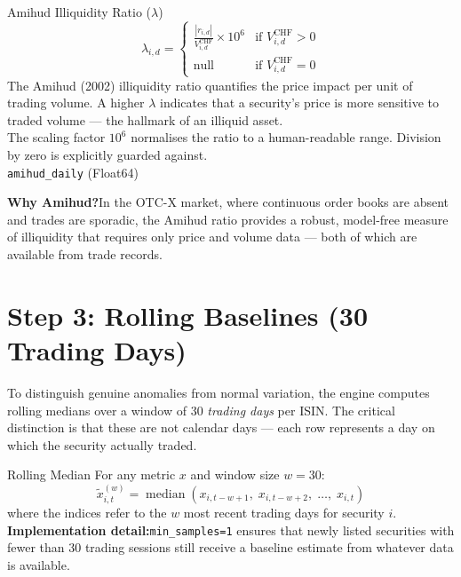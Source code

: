 \documentclass[
  11pt,
  a4paper,
  twoside,
  openany
]{report}
\begin{document}
\begin{formulabox}{Amihud Illiquidity Ratio ($\lambda$)}
\[
  \lambda_{i,d} =
  \begin{cases}
    \displaystyle\frac{|r_{i,d}|}{V_{i,d}^{\text{CHF}}} \times 10^{6} & \text{if } V_{i,d}^{\text{CHF}} > 0 \\[8pt]
    \text{null} & \text{if } V_{i,d}^{\text{CHF}} = 0
  \end{cases}
\]
The Amihud (2002) illiquidity ratio quantifies the price impact per unit of trading volume.  A higher $\lambda$ indicates that a security's price is more sensitive to traded volume — the hallmark of an illiquid asset.\\[4pt]
The scaling factor $10^6$ normalises the ratio to a human-readable range.  Division by zero is explicitly guarded against.\\[4pt]
\texttt{amihud\_daily} (Float64)
\end{formulabox}

\begin{insightbox}
\textbf{Why Amihud?}\;In the OTC-X market, where continuous order books are absent and trades are sporadic, the Amihud ratio provides a robust, model-free measure of illiquidity that requires only price and volume data — both of which are available from trade records.
\end{insightbox}

\section{Step 3: Rolling Baselines (30 Trading Days)}

To distinguish genuine anomalies from normal variation, the engine computes rolling medians over a window of 30 \emph{trading days} per ISIN.  The critical distinction is that these are not calendar days — each row represents a day on which the security actually traded.

\begin{formulabox}{Rolling Median}
For any metric $x$ and window size $w = 30$:
\[
  \tilde{x}_{i,t}^{(w)} = \operatorname{median}\!\left(x_{i,t-w+1},\; x_{i,t-w+2},\; \ldots,\; x_{i,t}\right)
\]
where the indices refer to the $w$ most recent trading days for security $i$.\\[6pt]
\textbf{Implementation detail:}\;\texttt{min\_samples=1} ensures that newly listed securities with fewer than 30 trading sessions still receive a baseline estimate from whatever data is available.
\end{formulabox}
\end{document}
